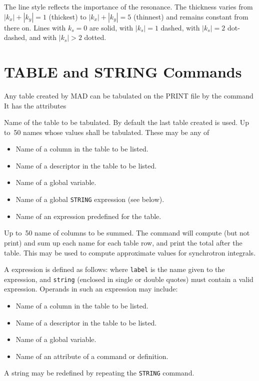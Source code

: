 The line style reflects the importance of the resonance.
The thickness varies from \(|k_x| + |k_y| = 1\) (thickest) to
\(|k_x| + |k_y| = 5\) (thinnest) and remains constant from there on.
Lines with \(k_s = 0\) are solid, with \(|k_s| = 1\) dashed,
with \(|k_s| = 2\) dot-dashed, and with \(|k_s| > 2\) dotted.

\section{TABLE and STRING Commands}
\label{S-TABLE}
Any table created by MAD can be tabulated on the PRINT file by the command
It has the attributes
\begin{mylist}
Name of the table to be tabulated.
By default the last table created is used.
Up to~50 names whose values shall be tabulated.
These may be any of
\begin{itemize}
\item Name of a column in the table to be listed.
\item Name of a descriptor in the table to be listed.
\item Name of a global variable.
\item Name of a global {\tt STRING} expression (see below).
\item Name of an expression predefined for the table.
\end{itemize}
Up to~50 name of columns to be summed.
The  command will compute (but not print) and sum up
each name for each table row,
and print the total after the table.
This may be used to compute approximate values for synchrotron integrals.
\end{mylist}

A  expression is defined as follows:
where {\tt label} is the name given to the expression,
and {\tt string} (enclosed in single or double quotes)
must contain a valid expression.
Operands in such an expression may include:
\begin{itemize}
\item Name of a column in the table to be listed.
\item Name of a descriptor in the table to be listed.
\item Name of a global variable.
\item Name of an attribute of a command or definition.
\end{itemize}
A string may be redefined by repeating the {\tt STRING} command.

